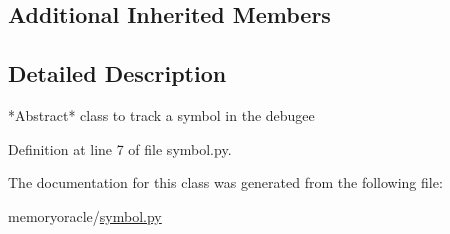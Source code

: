\subsection*{Additional Inherited Members}


\subsection{Detailed Description}
\begin{DoxyVerb}*Abstract* class to track a symbol in the debugee
\end{DoxyVerb}
 

Definition at line 7 of file symbol.\+py.



The documentation for this class was generated from the following file\+:\begin{DoxyCompactItemize}
\item 
memoryoracle/\hyperlink{symbol_8py}{symbol.\+py}\end{DoxyCompactItemize}
